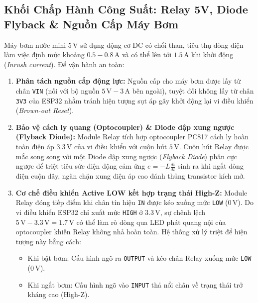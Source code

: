 \subsection{Khối Chấp Hành Công Suất: Relay 5V, Diode Flyback \& Nguồn Cấp Máy Bơm}
Máy bơm nước mini $5\,\text{V}$ sử dụng động cơ DC có chổi than, tiêu thụ dòng điện làm việc định mức khoảng $0.5 - 0.8\,\text{A}$ và có thể lên tới $1.5\,\text{A}$ khi khởi động (\textit{Inrush current}). Để vận hành an toàn:
\begin{enumerate}
    \item \textbf{Phân tách nguồn cấp động lực:} Nguồn cấp cho máy bơm được lấy từ chân \texttt{VIN} (nối với bộ nguồn $5\,\text{V} - 3\,\text{A}$ bên ngoài), tuyệt đối không lấy từ chân \texttt{3V3} của ESP32 nhằm tránh hiện tượng sụt áp gây khởi động lại vi điều khiển (\textit{Brown-out Reset}).
    \item \textbf{Bảo vệ cách ly quang (Optocoupler) \& Diode dập xung ngược (Flyback Diode):} Module Relay tích hợp optocoupler PC817 cách ly hoàn toàn điện áp $3.3\,\text{V}$ của vi điều khiển với cuộn hút $5\,\text{V}$. Cuộn hút Relay được mắc song song với một Diode dập xung ngược (\textit{Flyback Diode}) phân cực ngược để triệt tiêu sức điện động cảm ứng $e = -L\frac{di}{dt}$ sinh ra khi ngắt dòng điện cuộn dây, ngăn chặn xung điện áp cao đánh thủng transistor kích mở.
    \item \textbf{Cơ chế điều khiển Active LOW kết hợp trạng thái High-Z:}
    Module Relay đóng tiếp điểm khi chân tín hiệu \texttt{IN} được kéo xuống mức \texttt{LOW} ($0\,\text{V}$). Do vi điều khiển ESP32 chỉ xuất mức \texttt{HIGH} ở $3.3\,\text{V}$, sự chênh lệch $5\,\text{V} - 3.3\,\text{V} = 1.7\,\text{V}$ có thể làm rò dòng qua LED phát quang nội của optocoupler khiến Relay không nhả hoàn toàn. Hệ thống xử lý triệt để hiện tượng này bằng cách:
    \begin{itemize}
        \item Khi bật bơm: Cấu hình ngõ ra \texttt{OUTPUT} và kéo chân Relay xuống mức \texttt{LOW} ($0\,\text{V}$).
        \item Khi ngắt bơm: Cấu hình ngõ vào \texttt{INPUT} thả nổi chân về trạng thái trở kháng cao (High-Z).
    \end{itemize}
\end{enumerate}

